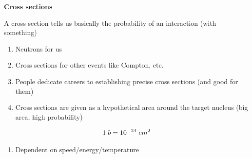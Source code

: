 \documentclass[aspectratio=1610,pdftex,dvipsnames,compress,xcolor={dvipsnames}]{beamer}
\begin{document}
\begin{frame}[plain]{}
    \centering\LARGE\textbf{Cross sections}
\end{frame}


\addtocounter{framenumber}{-1} 
\begin{frame}{A cross section tells us basically the probability of an interaction (with something)}
    \begin{enumerate}[series=outerlist,topsep=0pt,itemsep=21pt,leftmargin=*,label=(\arabic*)]
        \item[]Neutrons for us
        \item[]Cross sections for other events like Compton, etc.
        \item[]People dedicate careers to establishing precise cross sections (and good for them)
        \item[]Cross sections are given as a hypothetical area  around the target nucleus (big area, high probability)
    \end{enumerate}

    \vspace*{\fill}

    \begin{equation}
        \LARGE
        1 \; b = 10^{-24} \; cm^2
    \end{equation}

    \vspace*{\fill}

    \begin{enumerate}[series=outerlist,topsep=0pt,itemsep=21pt,leftmargin=*,label=(\arabic*)]
        \item[]Dependent on speed/energy/temperature
    \end{enumerate}
\end{frame}
\end{document}
